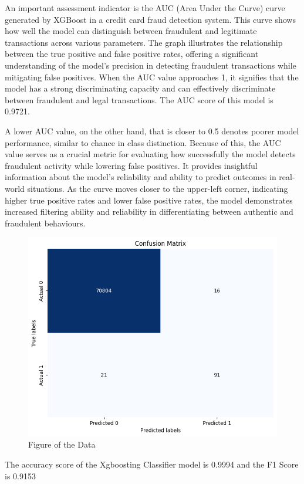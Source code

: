  An important assessment indicator is the AUC (Area Under the Curve) curve generated by XGBoost in a credit card fraud detection system. This curve shows how well the model can distinguish between fraudulent and legitimate transactions across various parameters. The graph illustrates the relationship between the true positive and false positive rates, offering a significant understanding of the model's precision in detecting fraudulent transactions while mitigating false positives. When the AUC value approaches 1, it signifies that the model has a strong discriminating capacity and can effectively discriminate between fraudulent and legal transactions. The AUC score of this model is 0.9721. 

 

 A lower AUC value, on the other hand, that is closer to 0.5 denotes poorer model performance, similar to chance in class distinction. Because of this, the AUC value serves as a crucial metric for evaluating how successfully the model detects fraudulent activity while lowering false positives. It provides insightful information about the model's reliability and ability to predict outcomes in real-world situations. As the curve moves closer to the upper-left corner, indicating higher true positive rates and lower false positive rates, the model demonstrates increased filtering ability and reliability in differentiating between authentic and fraudulent behaviours. 


\begin{figure}[ht]
    \centering
    \includegraphics[scale=0.7]{figures/CM_XGBoost.png}
    \caption{Figure of the Data}
    \label{fig:Plot of the Data}
\end{figure}
 The accuracy score of the Xgboosting Classifier model is 0.9994 and the F1 Score is 0.9153 

